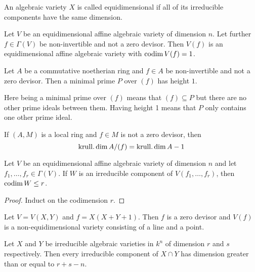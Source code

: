 \begin{definition}
An algebraic variety $X$ is called equidimensional if all of its irreducible components have the same dimension. 
\end{definition}

\begin{theorem}
Let $V$ be an equidimensional affine algebraic variety of dimension $n$. Let further $f\in \Gamma(V)$ be non-invertible and not a zero devisor. Then $V(f)$ is an equidimensional affine algebraic variety with $\operatorname{codim} V(f) = 1$. 
\end{theorem}

\begin{theorem}
Let $A$ be a commutative noetherian ring and $f\in A$ be non-invertible and not a zero devisor. Then a minimal prime $P$ over $(f)$ has height $1$. 
\end{theorem}

Here being a minimal prime over $(f)$ means that $(f)\subseteq P$ but there are no other prime ideals between them. Having height 1 means that $P$ only contains one other prime ideal. 

\begin{corollary}
If $(A, M)$ is a local ring and $f\in M$ is not a zero devisor, then 
\begin{equation*}
    \operatorname{krull.dim} A/(f) = \operatorname{krull.dim} A - 1
\end{equation*}
\end{corollary}

\begin{corollary}
Let $V$ be an equidimensional affine algebraic variety of dimension $n$ and let $f_1, \ldots, f_r \in \Gamma(V)$. If $W$ is an irreducible component of $V(f_1, \ldots, f_r)$, then $\operatorname{codim} W \leq r$. 
\end{corollary}
\begin{proof}
Induct on the codimension $r$. 
\end{proof}



\begin{example}
Let $V=V(X, Y)$ and $f=X(X+Y+1)$. Then $f$ is a zero devisor and $V(f)$ is a non-equidimensional variety consisting of a line and a point. 
\end{example}

\begin{proposition}
Let $X$ and $Y$ be irreducible algebraic varieties in $k^n$ of dimension $r$ and $s$ respectively. Then every irreducible component of $X\cap Y$ has dimension greater than or equal to $r+s-n$.
\end{proposition}

